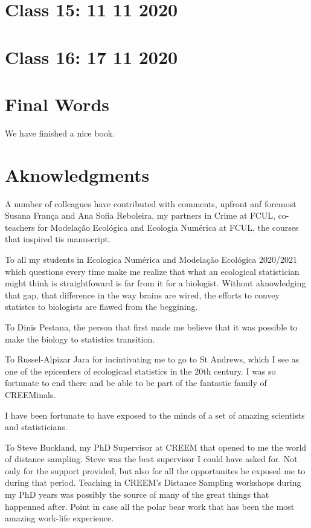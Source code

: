 \documentclass[
]{book}
\begin{document}
\hypertarget{aula15}{%
\chapter{Class 15: 11 11 2020}\label{aula15}}

\hypertarget{aula16}{%
\chapter{Class 16: 17 11 2020}\label{aula16}}

\hypertarget{final-words}{%
\chapter{Final Words}\label{final-words}}

We have finished a nice book.

\hypertarget{aknowledgments}{%
\chapter{Aknowledgments}\label{aknowledgments}}

A number of colleagues have contributed with comments, upfront anf foremost Susana França and Ana Sofia Reboleira, my partners in Crime at FCUL, co-teachers for Modelação Ecológica and Ecologia Numérica at FCUL, the courses that inspired tis manuscript.

To all my students in Ecologica Numérica and Modelação Ecológica 2020/2021 which questions every time make me realize that what an ecological statistician might think is straightfoward is far from it for a biologist. Without aknowledging that gap, that difference in the way brains are wired, the efforts to convey statistcs to biologists are flawed from the beggining.

To Dinis Pestana, the person that first made me believe that it was possible to make the biology to statistics transition.

To Russel-Alpizar Jara for incintivating me to go to St Andrews, which I see as one of the epicenters of ecologicasl statistics in the 20th century. I was so fortunate to end there and be able to be part of the fantastic family of CREEMinals.

I have been fortunate to have exposed to the minds of a set of amazing scientists and statisticians.

To Steve Buckland, my PhD Supervisor at CREEM that opened to me the world of distance sampling. Steve was the best supervisor I could have asked for. Not only for the support provided, but also for all the opportunites he exposed me to during that period. Teaching in CREEM's Distance Sampling workshops during my PhD years was possibly the source of many of the great things that happenned after. Point in case all the polar bear work that has been the most amazing work-life experience.
\end{document}

